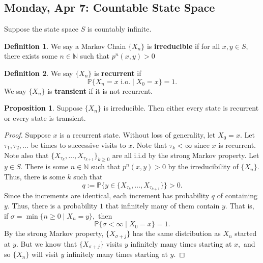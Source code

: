 \documentclass[10pt, oneside]{article}
\newcommand{\bbP}{\mathbb{P}}
\newcommand{\bbN}{\mathbb{N}}
\theoremstyle{definition}
\newtheorem{defn}{Definition}
\newtheorem{prop}{Proposition}
\begin{document}
\subsection{Monday, Apr 7: Countable State Space}
Suppose the state space $S$ is countably infinite.
\begin{defn}
     We say a Markov Chain $\{X_n\}$ is \textbf{irreducible} if for all $x,y \in S,$ there exists some $n \in \bbN$ such that $p^n(x,y) >0$
\end{defn}
\begin{defn}
    We say $\{X_n\}$ is \textbf{recurrent} if 
    \[\bbP\{X_n = x \text{ i.o.}\mid X_0 = x\} = 1.\] We say $\{X_n\}$ is \textbf{transient} if it is not recurrent.
\end{defn}
\begin{prop}
    Suppose $\{X_n\}$ is irreducible. Then either every state is recurrent or every state is transient.
\end{prop}
\begin{proof}
    Suppose $x$ is a recurrent state. Without loss of generality, let $X_0 = x.$ Let $\tau_1, \tau_2,\dots$ be times to successive visits to $x.$ Note that $\tau_k < \infty$ since $x$ is recurrent. Note also that $\{X_{\tau_k}, \dots, X_{\tau_{k+1}}\}_{k\geq 0}$ are all i.i.d by the strong Markov property. Let $y \in S.$ There is some $n \in \bbN$ such that $p^n(x,y)>0$ by the irreducibility of $\{X_n\}.$ Thus, there is some $k$ such that \[q:=\bbP\{y \in \{X_{\tau_k}, \dots, X_{\tau_{k+1}}\}\}>0.\] Since the increments are identical, each increment has probability $q$ of containing $y.$ Thus, there is a probability $1$ that infinitely many of them contain $y.$ That is, if $\sigma = \min\{n\geq 0 \mid X_n = y\},$ then 
    \[\bbP\{\sigma < \infty \mid X_0 = x\} = 1.\] By the strong Markov property, $\{X_{\sigma + j}\}$ has the same distribution as $X_n$ started at $y.$ But we know that $\{X_{\sigma + j}\}$ visits $y$ infinitely many times starting at $x,$ and so $\{X_n\}$ will visit $y$ infinitely many times starting at $y.$
\end{proof}
\end{document}
